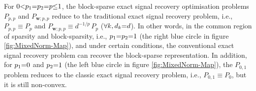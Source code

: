 \begin{remark}
For $0 {<} p_1 {=} p_2 {=} p {\leq} 1$, the block-sparse exact signal recovery optimisation problems $P_{p,p}$ and $P_{\boldsymbol{w};p,p}$ reduce to the traditional exact signal recovery problem, i.e., $P_{p,p} {\equiv} P_p$ and $P_{\boldsymbol{w};p,p} {\equiv} d^{-1/p} \, P_p$ ($\forall k, d_k {=} d$).
In other words, in the common region of sparsity and block-sparsity, i.e., $p_1 {=} p_2 {=} 1$ (the right blue circle in figure \ref{fig:MixedNorm-Map}), and under certain conditions, the conventional exact signal recovery problem can recover the block-sparse representation.
In addition, for $p_1 {=} 0$ and $p_2 {=} 1$ (the left blue circle in figure \ref{fig:MixedNorm-Map}), the $P_{0,1}$ problem reduces to the classic exact signal recovery problem, i.e., $P_{0,1} {\equiv} P_0$, but it is still non-convex.
\end{remark}